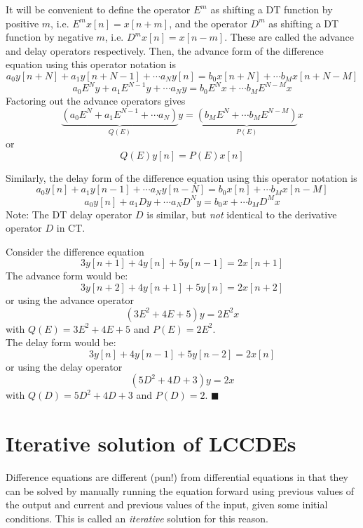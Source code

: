 It will be convenient to define the operator $E^m$ as shifting a DT function by positive $m$, i.e. $E^m x[n] = x[n+m]$, and the operator $D^m$ as shifting a DT function by negative $m$, i.e. $D^m x[n] = x[n-m]$. These are called the advance and delay operators respectively. Then, the advance form of the difference equation using this operator notation is
\[
a_0y[n+N] + a_1y[n+N-1] + \cdots a_N y[n] = b_0 x[n+N] + \cdots b_Mx[n+N-M]
\]
\[
a_0 E^Ny + a_1E^{N-1}y + \cdots a_N y = b_0 E^{N}x + \cdots b_M E^{N-M}x
\]
Factoring out the advance operators gives
\[
\underbrace{\left(a_0E^N + a_1E^{N-1} + \cdots a_N\right)}_{Q(E)} y = \underbrace{\left(b_M E^{N} + \cdots b_M E^{N-M}\right)}_{P(E)} x
\]
or
\[
Q(E)y[n] = P(E)x[n]
\]

Similarly, the delay form of the difference equation using this operator notation is
\[
a_0y[n] + a_1y[n-1] + \cdots a_N y[n-N] = b_0 x[n] + \cdots b_Mx[n-M]
\]
\[
a_0y[n] + a_1 Dy + \cdots a_N D^N y = b_0 x + \cdots b_MD^M x
\]
Note: The DT delay operator $D$ is similar, but \emph{not} identical to the derivative operator $D$ in CT.

\begin{example}
  Consider the difference equation
  \[
  3y[n+1] + 4y[n] + 5y[n-1] = 2x[n+1]
  \]
  The advance form would be:
  \[
  3y[n+2] + 4y[n+1] + 5y[n] = 2x[n+2]
  \]
  or using the advance operator
  \[
  \left(3E^2 + 4E + 5\right)y = 2E^2x
  \]
  with $Q(E) = 3E^2 + 4E + 5$ and $P(E) = 2E^2$.\\[1em]
  The delay form would be:
  \[
  3y[n] + 4y[n-1] + 5y[n-2] = 2x[n]
  \]
  or using the delay operator
  \[
  \left(5D^2 + 4D + 3\right)y = 2x
  \]
  with $Q(D) = 5D^2 + 4D + 3$ and $P(D) = 2$.
$\blacksquare$
\end{example}

\section{Iterative solution of LCCDEs}

Difference equations are different (pun!) from differential equations in that they can be solved by manually running the equation forward using previous values of the output and current and previous values of the input, given some initial conditions. This is called an \emph{iterative} solution for this reason.

